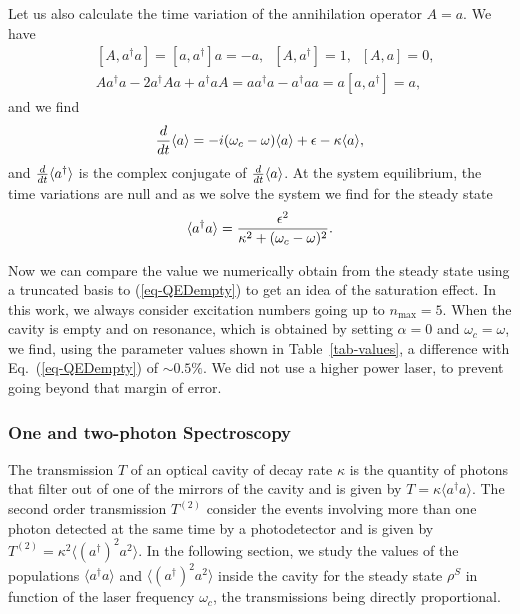 Let us also calculate the time variation of the annihilation operator $A=a$. We have
\begin{align}
     & [A, a^\dagger a]= [a, a^\dagger ] a = -a  , \;\; [A, a^\dagger ] = 1, \;\; [A, a]= 0,                     \\
     & Aa^\dagger a  - 2 a^\dagger A a + a^\dagger a A= a a^\dagger a - a^\dagger a a =  a [a, a^\dagger ] = a ,
\end{align}
and we find
\[ \frac{d}{dt} \langle a \rangle =  -i(\omega_c - \omega) \langle a \rangle +\epsilon - \kappa \langle a \rangle, \]
and $\frac{d}{dt} \langle a^\dagger \rangle$ is the complex conjugate of $\frac{d}{dt} \langle a \rangle$.  At the system equilibrium, the time variations are null and as we solve the system we find for the steady state
\[\langle a^\dagger a \rangle = \frac{\epsilon^2}{\kappa^2 + (\omega_c-\omega)^2}.  \label{eq-QEDempty}\]

Now we can compare the value we numerically obtain from the steady state using a truncated basis to (\ref{eq-QEDempty}) to get an idea of the saturation effect. In this work, we always consider excitation numbers going up to $n_{\mbox{max}}=5$. When the cavity is empty and on resonance, which is obtained by setting $\alpha=0$ and $\omega_c = \omega$, we find, using the parameter values shown in Table~\ref{tab-values}, a difference with Eq.~(\ref{eq-QEDempty}) of $\sim 0.5\%$. We did not use a higher power laser, to prevent going beyond that margin of error.

\subsubsection{One and two-photon Spectroscopy}

The transmission $T$ of an optical cavity of decay rate $\kappa$ is the quantity of photons that filter out of one of the mirrors of the cavity and is given by $T=\kappa \langle a^\dagger a \rangle$. The second order transmission $T^{(2)}$  consider the events involving more than one photon detected at the same time by a photodetector and is given by $T^{(2)}=\kappa^2 \langle (a^\dagger)^2 a^2 \rangle$. In the following section, we study the values of the populations $\langle a^\dagger a \rangle$ and $\langle (a^\dagger)^2 a^2 \rangle$ inside the cavity for the steady state $\rho^S$ in function of the laser frequency $\omega_c$, the transmissions being directly proportional.

